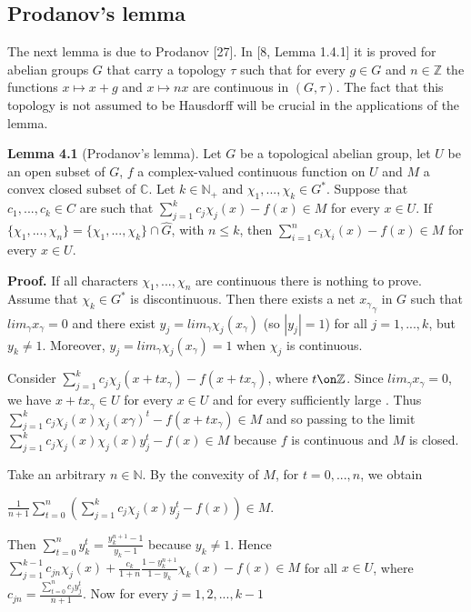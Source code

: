 \documentclass[12pt]{article}
\begin{document}
\subsection{Prodanov's lemma}


    The next lemma is due to Prodanov [27]. In [8, Lemma 1.4.1] it is proved for abelian groups $G$ that carry a topology $\tau$
such that for every $g \in G$ and $n \in \mathbb{Z}$ the functions $x \mapsto x + g$ and $x \mapsto nx$ are continuous in $(G, \tau)$. The fact that this topology
is not assumed to be Hausdorff will be crucial in the applications of the lemma.


\textbf{Lemma 4.1} (Prodanov's lemma). Let $G$ be a topological abelian group, let $U$ be an open subset of $G$, $f$ a complex-valued continuous
function on $U$ and $M$ a convex closed subset of $\mathbb{C}$. Let $k \in \mathbb{N}_+$ and $\chi_1,...,\chi_k \in G^*$. Suppose that $c_1,..., c_k \in C$ are such that
$\sum^k_{j=1} c_j \chi_j(x) - f(x) \in M$ for every $x \in U$. If $\{\chi_1,...,\chi_n\}=\{\chi_1,...,\chi_k\} \cap \widehat{G}$, with $n \leqslant k$, then $\sum^n_{i=1} c_i \chi_i(x) - f (x) \in M$ for every
$x \in U$.


\textbf{Proof.} If all characters $\chi_1,...,\chi_n$ are continuous there is nothing to prove. Assume that $\chi_k \in G^*$ is discontinuous. Then
there exists a net ${x_\gamma}_\gamma$ in $G$ such that $lim_\gamma x_\gamma = 0$ and there exist $y_j = lim_\gamma \chi_j (x_\gamma)$ (so $|y_j| = 1$) for all $j = 1,...,k$, but
$y_k \neq 1$. Moreover, $y_j = lim_\gamma \chi_j (x_\gamma )= 1$ when $\chi_j$ is continuous.


    Consider $\sum^k_{j=1} c_j \chi_j (x + tx_\gamma) - f (x + tx_\gamma)$, where $t \on \mathbb{Z}$. Since $lim_\gamma x_\gamma = 0$, we have $x + tx_\gamma \in U$ for every $x \in U$ and
for every sufficiently large \gamma. Thus $\sum^k_{j=1} c_j \chi_j (x) \chi_j(x\gamma)^t - f(x + tx_\gamma) \in M$ and so passing to the limit $\sum^k_{j=1} c_j \chi_j (x) \chi_j(x)y^t_j - f(x) \in M$
because $f$ is continuous and $M$ is closed.


    Take an arbitrary $n \in \mathbb{N}$. By the convexity of $M$, for $t = 0,...,n$, we obtain


    $\frac{1}{n + 1} \sum^n_{t=0} (\sum^k_{j=1} c_j \chi_j (x)y^t_j - f (x)) \in M$.


    Then $\sum^n_{t=0} y^t_k = \frac{y^{n+1}_k -1}{y_k-1}$ because $y_k \neq 1$. Hence $\sum_{j=1}^{k-1} c_{jn} \chi_j(x) + \frac{c_k}{1+n} \frac{1-y^{n+1}_k}{1-y_k} \chi_k(x) - f (x) \in M$ for all $x \in U$, where 
$c_{jn} = \frac{\sum^{n}_{t=0} c_j y^t_j}{n+1}$. Now for every $j = 1, 2,...,k - 1$
\end{document}

